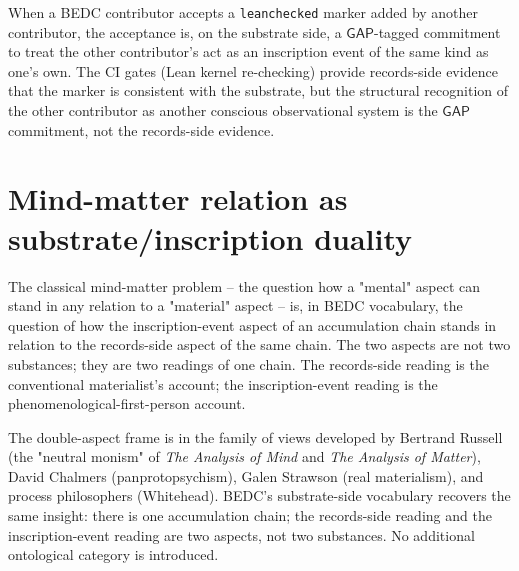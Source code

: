 \begin{example}
\label{ex:hard-problems-trusting-peer-leanchecked}
When a BEDC contributor accepts a \texttt{leanchecked} marker added by another contributor, the acceptance is, on the substrate side, a $\mathsf{GAP}$-tagged commitment to treat the other contributor's act as an inscription event of the same kind as one's own. The CI gates (Lean kernel re-checking) provide records-side evidence that the marker is consistent with the substrate, but the structural recognition of the other contributor as another conscious observational system is the $\mathsf{GAP}$ commitment, not the records-side evidence.
\end{example}

\section{Mind-matter relation as substrate/inscription duality}
\label{sec:hard-problems-mind-matter}

\begin{principle}
\label{prin:hard-problems-mind-matter-two-aspects}
The classical mind-matter problem -- the question how a "mental" aspect can stand in any relation to a "material" aspect -- is, in BEDC vocabulary, the question of how the inscription-event aspect of an accumulation chain stands in relation to the records-side aspect of the same chain. The two aspects are not two substances; they are two readings of one chain. The records-side reading is the conventional materialist's account; the inscription-event reading is the phenomenological-first-person account.
\end{principle}

\begin{remark}
\label{rem:hard-problems-russellian-double-aspect}
The double-aspect frame is in the family of views developed by Bertrand Russell (the "neutral monism" of \emph{The Analysis of Mind} and \emph{The Analysis of Matter}), David Chalmers (panprotopsychism), Galen Strawson (real materialism), and process philosophers (Whitehead). BEDC's substrate-side vocabulary recovers the same insight: there is one accumulation chain; the records-side reading and the inscription-event reading are two aspects, not two substances. No additional ontological category is introduced.
\end{remark}

